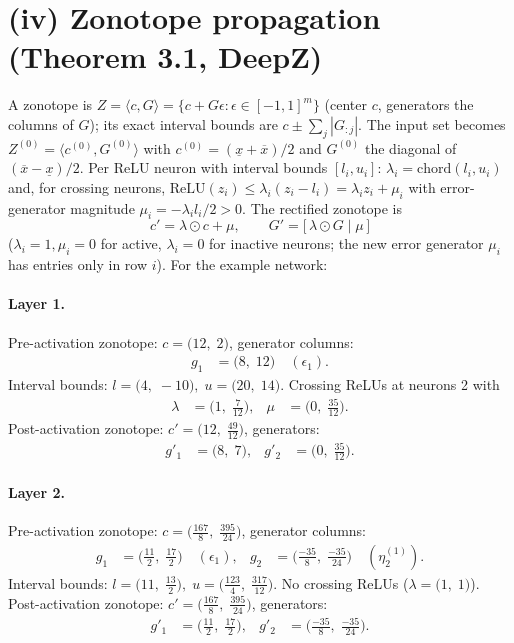 \documentclass[11pt]{article}
\begin{document}
\section{(iv) Zonotope propagation (Theorem 3.1, DeepZ)}
A zonotope is $Z = \langle c, G \rangle = \{c + G\epsilon : \epsilon \in [-1,1]^m\}$
(center $c$, generators the columns of $G$); its exact interval bounds are
$c \pm \sum_j |G_{:j}|$. The input set becomes $Z^{(0)} = \langle c^{(0)}, G^{(0)} \rangle$ with
$c^{(0)} = (\underline{x} + \overline{x})/2$ and $G^{(0)}$ the diagonal of $(\overline{x} - \underline{x})/2$.
Per ReLU neuron with interval bounds $[l_i, u_i]$:
$\lambda_i = \mathrm{chord}(l_i, u_i)$ and, for crossing neurons,
$\mathrm{ReLU}(z_i) \le \lambda_i (z_i - l_i) = \lambda_i z_i + \mu_i$ with error-generator magnitude
$\mu_i = -\lambda_i l_i / 2 > 0$. The rectified zonotope is
\begin{equation*}
c' = \lambda \odot c + \mu, \qquad G' = \bigl[\, \lambda \odot G \;\big|\; \mu\, \bigr]
\end{equation*}
($\lambda_i = 1, \mu_i = 0$ for active, $\lambda_i = 0$ for inactive neurons;
the new error generator $\mu_i$ has entries only in row $i$).
For the example network:
\paragraph{Layer 1.}
Pre-activation zonotope: $c = \bigl(12,\; 2\bigr)$, generator columns:
\begin{align*}
g_{1} &= \bigl(8,\; 12\bigr) \quad (\epsilon_{1}).
\end{align*}
Interval bounds: $l = \bigl(4,\; -10\bigr), \; u = \bigl(20,\; 14\bigr)$. 
Crossing ReLUs at neurons 2 with
\begin{align*}
\lambda &= \bigl(1,\; \frac{7}{12}\bigr), & \mu &= \bigl(0,\; \frac{35}{12}\bigr).
\end{align*}
Post-activation zonotope: $c' = \bigl(12,\; \frac{49}{12}\bigr)$, generators:
\begin{align*}
g'_{1} &= \bigl(8,\; 7\bigr), &
g'_{2} &= \bigl(0,\; \frac{35}{12}\bigr).
\end{align*}
\paragraph{Layer 2.}
Pre-activation zonotope: $c = \bigl(\frac{167}{8},\; \frac{395}{24}\bigr)$, generator columns:
\begin{align*}
g_{1} &= \bigl(\frac{11}{2},\; \frac{17}{2}\bigr) \quad (\epsilon_{1}), &
g_{2} &= \bigl(\frac{-35}{8},\; \frac{-35}{24}\bigr) \quad (\eta^{(1)}_{2}).
\end{align*}
Interval bounds: $l = \bigl(11,\; \frac{13}{2}\bigr), \; u = \bigl(\frac{123}{4},\; \frac{317}{12}\bigr)$. 
No crossing ReLUs ($\lambda = \bigl(1,\; 1\bigr)$).
Post-activation zonotope: $c' = \bigl(\frac{167}{8},\; \frac{395}{24}\bigr)$, generators:
\begin{align*}
g'_{1} &= \bigl(\frac{11}{2},\; \frac{17}{2}\bigr), &
g'_{2} &= \bigl(\frac{-35}{8},\; \frac{-35}{24}\bigr).
\end{align*}
\end{document}
